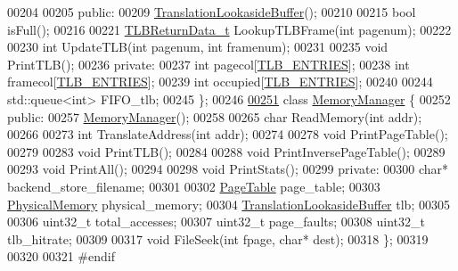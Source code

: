 \begin{DoxyCode}
00204 
00205 \textcolor{keyword}{public}:
00209     \hyperlink{classTranslationLookasideBuffer}{TranslationLookasideBuffer}();
00210 
00215     \textcolor{keywordtype}{bool} isFull();
00216 
00221     \hyperlink{structTLBReturnData__t}{TLBReturnData\_t} LookupTLBFrame(\textcolor{keywordtype}{int} pagenum);
00222 
00230     \textcolor{keywordtype}{int} UpdateTLB(\textcolor{keywordtype}{int} pagenum, \textcolor{keywordtype}{int} framenum);
00231 
00235     \textcolor{keywordtype}{void} PrintTLB();
00236 \textcolor{keyword}{private}:
00237     \textcolor{keywordtype}{int} pagecol[\hyperlink{memory_8h_a49009cc208379999b117ed68da61c759}{TLB\_ENTRIES}];
00238     \textcolor{keywordtype}{int} framecol[\hyperlink{memory_8h_a49009cc208379999b117ed68da61c759}{TLB\_ENTRIES}];
00239     \textcolor{keywordtype}{int} occupied[\hyperlink{memory_8h_a49009cc208379999b117ed68da61c759}{TLB\_ENTRIES}];
00240 
00244     std::queue<int> FIFO\_tlb;
00245 \};
00246 
\hypertarget{memory_8h_source.tex_l00251}{}\hyperlink{classMemoryManager}{00251} \textcolor{keyword}{class }\hyperlink{classMemoryManager}{MemoryManager} \{
00252 \textcolor{keyword}{public}:
00257     \hyperlink{classMemoryManager}{MemoryManager}();
00258     
00265     \textcolor{keywordtype}{char} ReadMemory(\textcolor{keywordtype}{int} addr);
00266 
00273     \textcolor{keywordtype}{int} TranslateAddress(\textcolor{keywordtype}{int} addr);
00274 
00278     \textcolor{keywordtype}{void} PrintPageTable();
00279 
00283     \textcolor{keywordtype}{void} PrintTLB();
00284 
00288     \textcolor{keywordtype}{void} PrintInversePageTable();
00289 
00293     \textcolor{keywordtype}{void} PrintAll();
00294 
00298     \textcolor{keywordtype}{void} PrintStats();
00299 \textcolor{keyword}{private}:
00300     \textcolor{keywordtype}{char}* backend\_store\_filename;
00301 
00302     \hyperlink{classPageTable}{PageTable} page\_table;
00303     \hyperlink{classPhysicalMemory}{PhysicalMemory} physical\_memory;
00304     \hyperlink{classTranslationLookasideBuffer}{TranslationLookasideBuffer} tlb;
00305 
00306     uint32\_t total\_accesses;
00307     uint32\_t page\_faults;
00308     uint32\_t tlb\_hitrate;
00309 
00317     \textcolor{keywordtype}{void} FileSeek(\textcolor{keywordtype}{int} fpage, \textcolor{keywordtype}{char}* dest);
00318 \};
00319 
00320 
00321 \textcolor{preprocessor}{#endif}
\end{DoxyCode}
